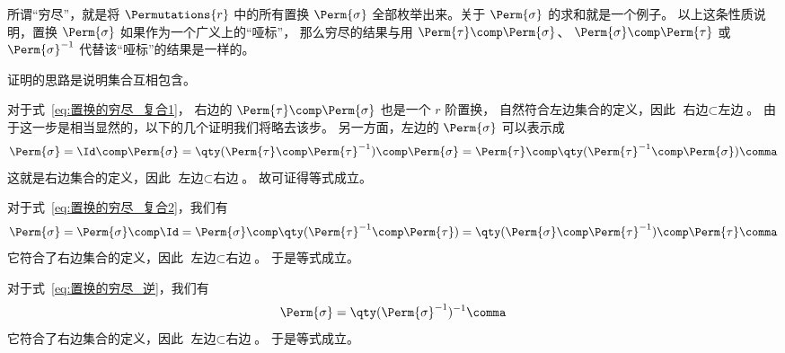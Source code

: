 所谓“穷尽”，就是将 $\Permutations{r}$ 中的所有置换 $\Perm{\sigma}$
全部枚举出来。关于 $\Perm{\sigma}$ 的求和就是一个例子。
以上这条性质说明，置换 $\Perm{\sigma}$ 如果作为一个广义上的“哑标”，
那么穷尽的结果与用 $\Perm{\tau}\comp\Perm{\sigma}$、
$\Perm{\sigma}\comp\Perm{\tau}$ 或 $\Perm{\sigma}^{-1}$
代替该“哑标”的结果是一样的。


\begin{myProof}
证明的思路是说明集合互相包含。

对于式~\eqref{eq:置换的穷尽_复合1}，
右边的 $\Perm{\tau}\comp\Perm{\sigma}$ 也是一个 $r$ 阶置换，
自然符合左边集合的定义，因此 $\text{右边}\subset\text{左边}$。
由于这一步是相当显然的，以下的几个证明我们将略去该步。
另一方面，左边的 $\Perm{\sigma}$ 可以表示成
\begin{equation}
	\Perm{\sigma}
	=\Id\comp\Perm{\sigma}
	=\qty(\Perm{\tau}\comp\Perm{\tau}^{-1}) \comp\Perm{\sigma}
	=\Perm{\tau}\comp \qty(\Perm{\tau}^{-1}\comp\Perm{\sigma})
	\comma
\end{equation}
这就是右边集合的定义，因此 $\text{左边}\subset\text{右边}$。
故可证得等式成立。

对于式~\eqref{eq:置换的穷尽_复合2}，我们有
\begin{equation}
	\Perm{\sigma}
	=\Perm{\sigma}\comp\Id
	=\Perm{\sigma}\comp \qty(\Perm{\tau}^{-1}\comp\Perm{\tau})
	=\qty(\Perm{\sigma}\comp\Perm{\tau}^{-1}) \comp\Perm{\tau}
	\comma
\end{equation}
它符合了右边集合的定义，因此 $\text{左边}\subset\text{右边}$。
于是等式成立。

对于式~\eqref{eq:置换的穷尽_逆}，我们有
\begin{equation}
	\Perm{\sigma}=\qty(\Perm{\sigma}^{-1})^{-1} \comma
\end{equation}
它符合了右边集合的定义，因此 $\text{左边}\subset\text{右边}$。
于是等式成立。
\end{myProof}

